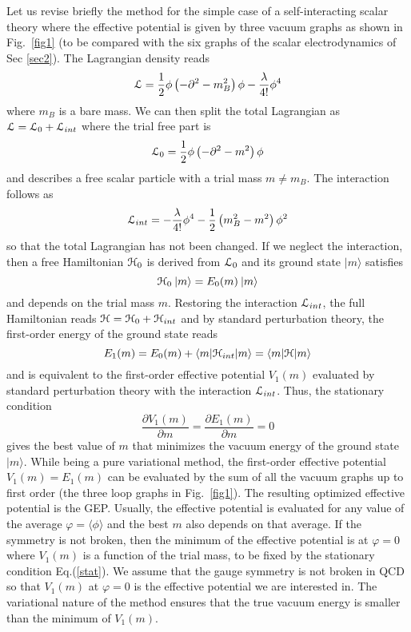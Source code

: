 \documentclass[aps,preprint]{revtex4}
\newcommand{\BE}{\begin{equation}}
\newcommand{\EE}{\end{equation}}
\begin{document}
Let us revise briefly the method for the simple case of a self-interacting scalar theory\cite{stevenson}
where the effective potential is given by three vacuum graphs as shown in Fig.~\ref{fig1} (to be compared with the
six graphs of the scalar electrodynamics of Sec \ref{sec2}). 
The Lagrangian density reads
\BE
{\cal L}=\frac{1}{2} \phi \left(-\partial^2-m_B^2\right)\phi-\frac{\lambda}{4!}\phi^4
\label{Lphi}
\EE
where $m_B$ is a bare mass. We can then split the total Lagrangian as ${\cal L}={\cal L}_0+{\cal L}_{int}$
where the trial free part is
\BE
{\cal L}_0=\frac{1}{2} \phi \left(-\partial^2-m^2\right)\phi
\label{Lfree}
\EE
and describes a free scalar particle with a trial mass $m\not= m_B$.
The interaction follows as
\BE
{\cal L}_{int}=-\frac{\lambda}{4!}\phi^4-\frac{1}{2} \left(m_B^2-m^2\right)\phi^2
\label{Lint}
\EE
so that the total Lagrangian has not been changed.
If we neglect the interaction, then a free Hamiltonian ${\cal H}_0$ is derived from ${\cal L}_0$ and its
ground state $\vert m\rangle$ satisfies
\BE
{\cal H}_0 \> \vert m\rangle=E_0(m)\> \vert m\rangle
\EE
and depends on the trial mass $m$.
Restoring the interaction ${\cal L}_{int}$, the full Hamiltonian reads ${\cal H}={\cal H}_0+{\cal H}_{int}$ and
by standard perturbation theory, the first-order energy of the ground state reads
\BE
E_1 (m)= E_0(m) + \langle m\vert {\cal H}_{int} \vert m\rangle=\langle m\vert {\cal H} \vert m\rangle
\label{E1}
\EE
and is equivalent to the first-order effective potential $V_1 (m) $ evaluated by standard perturbation theory
with the interaction ${\cal L}_{int}$. Thus, the stationary condition
\BE
\frac{\partial V_1 (m)}{\partial m}=\frac{\partial E_1 (m)}{\partial m}=0
\label{stat}
\EE
gives the best value of $m$ that minimizes the vacuum energy of the ground state $\vert m\rangle$.
While being a pure variational method, the first-order effective potential $V_1(m)=E_1(m)$ can be evaluated 
by the sum of all the vacuum graphs up to first order (the three loop graphs in Fig.~\ref{fig1}). 
The resulting optimized effective potential is the GEP. Usually, the effective potential
is evaluated for any value of the average $\varphi=\langle \phi\rangle$ and the best $m$ also depends on that average.
If the symmetry is not broken, then the minimum of the effective potential is at $\varphi=0$ where
$V_1 (m)$ is a function of the trial mass, to be fixed by the stationary condition Eq.(\ref{stat}).
We assume that the gauge symmetry is not broken in QCD so that $V_1(m)$ at $\varphi=0$ is the effective potential 
we are interested in.
The variational nature of the method ensures that the true vacuum energy is smaller than the minimum of $V_1(m)$.
\end{document}
